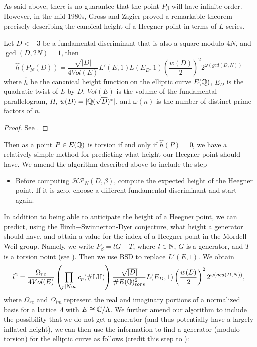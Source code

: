 As said above, there is no guarantee that the point $P_\beta$ will have infinite order. However, in the mid 1980s, Gross and Zagier proved a remarkable theorem precisely describing the canoical height of a Heegner point in terms of $L$-series.
\begin{thm} Let $D < -3$ be a fundamental discriminant that is also a square modulo $4N$, and $\gcd(D,2N) = 1$, then
\begin{equation}
\hat{h}(P_N(D)) = \frac{\sqrt{|D|}}{4Vol(E)}L'(E,1)L(E_D,1)\left(\frac{w(D)}{2}\right)^2 2^{\omega(gcd(D,N))}
\end{equation}
where $\hat{h}$ be the canonical height function on the elliptic curve $E(\mathbb{Q})$, $E_D$ is the quadratic twist of $E$ by $D$, $Vol(E)$ is the volume of the fundamental parallelogram, $\Pi$, $w(D) = |\mathbb{Q}(\sqrt{D})^*|$, and $\omega(n)$ is the number of distinct prime factors of $n$.
\end{thm}
\begin{proof}
See \cite{MR909238}.
\end{proof}
Then as a point $P \in E(\mathbb{Q})$ is torsion if and only if $\hat{h}(P) = 0$, we have a relatively simple method for predicting what height our Heegner point should have. We amend the algorithm described above to include the step
\begin{itemize}
\item{} Before computing $\mathcal{HP}_N(D,\beta)$, compute the expected height of the Heegner point. If it is zero, choose a different fundamental discriminant and start again.
\end{itemize}
In addition to being able to anticipate the height of a Heegner point, we can predict, using the Birch$-$Swinnerton-Dyer conjecture, what height a generator should have, and obtain a value for the index of a Heegner point in the Mordell-Weil group. Namely, we write $P_\beta = lG + T$, where $l \in \mathbb{N}$, $G$ is a generator, and $T$ is a torsion point (see \cite[Conjecture 3.2]{Watkins}). Then we use BSD \cite{BSD} to replace $L'(E,1)$. We obtain
\begin{equation}
l^2 = \frac{\Omega_{re}}{4Vol(E)}\left(\prod_{p|N\infty}c_p (\#\text{LII})\right)\frac{\sqrt{|D|}}{\#E(\mathbb{Q})^2_{tors}}L(E_D,1)\left(\frac{w(D)}{2}\right)^2 2^{\omega(gcd(D,N))},
\end{equation}
where $\Omega_{re}$ and $\Omega_{im}$ represent the real and imaginary portions of a normalized basis for a lattice $\Lambda$ with $E \cong \mathbb{C}/\Lambda$. We further amend our algorithm to include the possibility that we do not get a generator (and thus potentially have a largely inflated height), we can then use the information to find a generator (modulo torsion) for the elliptic curve as follows (credit this step to \cite{Watkins}):
